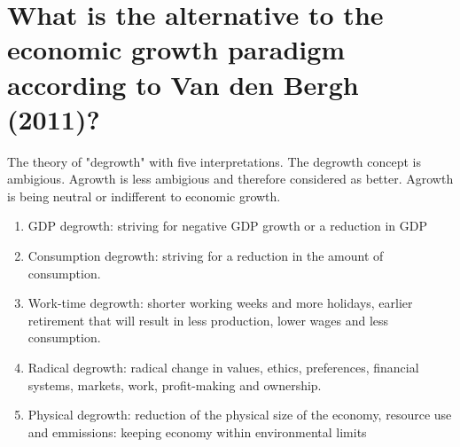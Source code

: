 \section{What is the alternative to the economic growth paradigm according to Van den Bergh (2011)?}
The theory of "degrowth" with five interpretations. The degrowth concept is ambigious. Agrowth is less ambigious and therefore considered as better. Agrowth is being neutral or indifferent to economic growth. 
\begin{enumerate}
\item GDP degrowth: striving for negative GDP growth or a reduction in GDP
\item Consumption degrowth: striving for a reduction in the amount of consumption. 
\item Work-time degrowth: shorter working weeks and more holidays, earlier retirement that will result in less production, lower wages and less consumption. 
\item Radical degrowth: radical change in values, ethics, preferences, financial systems, markets, work, profit-making and ownership. 
\item Physical degrowth: reduction of the physical size of the economy, resource use and emmissions: keeping economy within environmental limits
\end{enumerate}

\clearpage